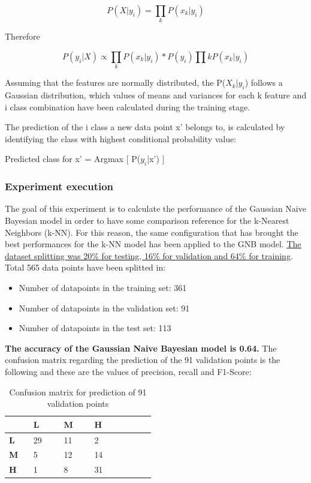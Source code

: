 \documentclass[11pt,a4paper]{article}
\begin{document}
\begin{displaymath}
P(X|y_i) = ∏_k P(x_k|y_i)
\end{displaymath}

Therefore

\begin{displaymath}
P(y_i|X) ∝ ∏_k P(x_k|y_i) * P(y_i)     ∏k P(x_k|y_i)
\end{displaymath}

Assuming that the features are normally distributed, the P($X_k$|$y_i$) follows a Gaussian distribution, which values of means and variances for each k feature and i class combination have been calculated during the training stage.

The prediction of the i class a new data point x' belongs to, is calculated by identifying the class with highest conditional probability value:

Predicted class for x' = Argmax [ P($y_i$|x') ]
\\
\subsubsection{Experiment execution} 
The goal of this experiment is to calculate the performance of the Gaussian Naive Bayesian model in order to have some comparison reference for the k-Nearest Neighbors (k-NN). 
For this reason, the same configuration that has brought the best performances for the k-NN model has been applied to the GNB model.
\uline{The dataset splitting was 20\% for testing, 16\% for validation and 64\% for training}. Total 565 data points have been splitted in: 
\begin{itemize}
\item Number of datapoints in the training set: 361
\item Number of datapoints in the validation set: 91
\item Number of datapoints in the test set: 113
\end{itemize}
\textbf{The accuracy of the Gaussian Naive Bayesian model is 0.64.}
The confusion matrix regarding the prediction of the 91 validation points is the following and these are the values of precision, recall and F1-Score:

\begin{table}
\centering
\begin{tabular}{p{0.12\linewidth}|p{0.15\linewidth}|p{0.15\linewidth}|p{0.15\linewidth}|p{0.15\linewidth}} \hline
&\textbf{L}&\textbf{M}&\textbf{H}\\ \hline
\textbf{L}&29&11&2\\ \hline
\textbf{M}&5&12&14\\ \hline
\textbf{H}&1&8&31\\ \hline
\end{tabular}
\caption{Confusion matrix for prediction of 91 validation points}
\label{tab:Confusion matrix for prediction of 91 validation pointsl}
\end{table}
\end{document}
